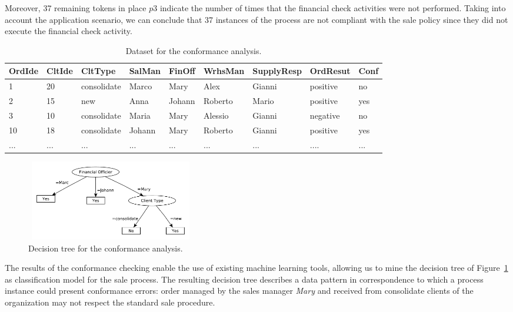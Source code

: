 \documentclass{llncs}
\begin{document}
Moreover, 37 remaining tokens in place $p3$ indicate the number of
times that the financial check activities were not performed.
Taking into account the application scenario, we can conclude that 
37 instances of the process are not compliant with the sale policy since
they did not execute the financial check activity.
{
\renewcommand{\arraystretch}{1.2}
\begin{table}[!h]
\scriptsize{
\caption{Dataset for the conformance analysis.}

\begin{tabular}{|p{1cm}|p{1cm}|p{}|p{}|p{}|p{}|p{}|p{}|p{}|}
\hline OrdIde & CltIde & CltType & SalMan & FinOff & WrhsMan & SupplyResp & OrdResut & Conf\\
\hline
1 & 20 & consolidate & Marco & Mary & Alex & Gianni & positive & no\\
\hline
2 & 15 & new & Anna & Johann & Roberto & Mario & positive & yes\\
\hline
3 & 10 &consolidate & Maria & Mary & Alessio & Gianni & negative & no\\
\hline
10 & 18 & consolidate & Johann & Mary & Roberto & Gianni & positive & yes \\
\hline
... & ... & ... & ... & ... & ... & ... & .... & ...  \\
\hline
\end{tabular}
}
\label{tab:SaleData}
\end{table}
\normalsize


\begin{figure}[h]
\centering
\includegraphics[width=210pt,height=100pt]
{./items/Sales_tree.pdf}
\caption{Decision tree for the conformance analysis.}
\label{salesDecTree}
\end{figure}

The results of the conformance checking enable the use of 
existing machine learning  tools, allowing us to mine the decision tree of Figure~\ref{salesDecTree} as classification model for the sale process.
The resulting decision tree describes a data pattern in correspondence to which a process instance could present conformance errors: order managed by the sales manager \emph{Mary} and received from consolidate clients of the organization may not respect the standard sale procedure. 

}
\end{document}
